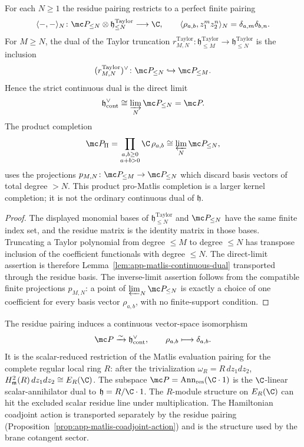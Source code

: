 \begin{lem}
\label{lem:app-matlis-finite-windows}
  For each \(N\geq1\) the residue pairing restricts to a perfect finite
  pairing
  \[
    \langle-,-\rangle_N\colon
    \mc P_{\leq N}\otimes
    \mathfrak h^{\mathrm{Taylor}}_{\leq N}\longrightarrow\C,
    \qquad
    \langle\rho_{a,b},z_1^mz_2^n\rangle_N
      =\delta_{a,m}\delta_{b,n}.
  \]
  For \(M\geq N\), the dual of the Taylor truncation
  \(r^{\mathrm{Taylor}}_{M,N}\colon
  \mathfrak h^{\mathrm{Taylor}}_{\leq M}\to
  \mathfrak h^{\mathrm{Taylor}}_{\leq N}\) is the
  inclusion
  \[
    (r^{\mathrm{Taylor}}_{M,N})^{\vee}\colon
    \mc P_{\leq N}\hookrightarrow \mc P_{\leq M}.
  \]
  Hence the strict continuous dual is the direct limit
  \[
    \mathfrak h^\vee_{\mathrm{cont}}
      \cong \varinjlim_N \mc P_{\leq N}=\mc P .
  \]
  The product completion
  \[
    \mc P_{\Pi}
      =
    \prod_{\substack{a,b\geq0\\a+b>0}}\C\,\rho_{a,b}
      \cong
    \varprojlim_N\mc P_{\leq N},
  \]
  uses the projections
  \(p_{M,N}\colon\mc P_{\leq M}\to\mc P_{\leq N}\) which discard basis
  vectors of total degree \(>N\).  This product pro-Matlis completion is
  a larger kernel completion; it is not the ordinary continuous dual of
  \(\mathfrak h\).
\end{lem}

\begin{proof}
  The displayed monomial bases of \(\mathfrak h^{\mathrm{Taylor}}_{\leq N}\) and
  \(\mc P_{\leq N}\) have the same finite index set, and the residue
  matrix is the identity matrix in those bases.  Truncating a Taylor
  polynomial from degree \(\leq M\) to degree \(\leq N\) has transpose
  inclusion of the coefficient functionals with degree \(\leq N\).  The
  direct-limit assertion is therefore Lemma~\ref{lem:app-matlis-continuous-dual}
  transported through the residue basis.  The inverse-limit assertion
  follows from the compatible finite projections \(p_{M,N}\): a point of
  \(\varprojlim_N\mc P_{\leq N}\) is exactly a choice of one coefficient
  for every basis vector \(\rho_{a,b}\), with no finite-support
  condition.
\end{proof}

\begin{prop}
\label{prop:app-matlis-realization}
  The residue pairing induces a continuous vector-space isomorphism
  \[
    \mc P\xrightarrow{\sim}\mathfrak h^\vee_{\mathrm{cont}},
    \qquad
    \rho_{a,b}\longmapsto\delta_{a,b}.
  \]
  It is the scalar-reduced restriction of the Matlis evaluation
  pairing for the complete regular local ring \(R\): after the
  trivialization \(\omega_R=R\,dz_1dz_2\),
  \(H^2_{\mathfrak m}(R)\,dz_1dz_2\cong E_R(\C)\).  The subspace
  \(\mc P=\operatorname{Ann}_{\mathrm{res}}(\C\cdot1)\) is the
  \(\C\)-linear scalar-annihilator dual to
  \(\mathfrak h=R/\C\cdot1\).  The \(R\)-module structure on
  \(E_R(\C)\) can hit the excluded scalar residue line under
  multiplication.  The Hamiltonian coadjoint action is
  transported separately by the residue pairing
  (Proposition~\ref{prop:app-matlis-coadjoint-action}) and is the
  structure used by the brane cotangent sector.
\end{prop}

